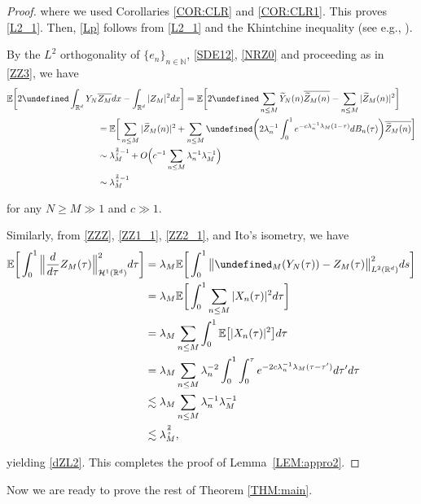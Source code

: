 \documentclass[%
11pt,  reqno]{amsart}
\theoremstyle{remarkstyle}
\newcommand{\1}{\hspace{0.2mm}\text{I}\hspace{0.2mm}}
\newcommand{\noi}{\noindent}
\newcommand{\R}{\mathbb{R}}
\let\Re=\undefined\DeclareMathOperator*{\Re}{Re}
\let\P= \undefined
\newcommand{\P}{\mathbf{P}}
\newcommand{\E}{\mathbb{E}}
\newcommand{\ld}{\lambda}
\newcommand{\wt}{\widetilde}
\newcommand{\cj}{\overline}
\newcommand{\les}{\lesssim}
\newcommand{\N}{\mathbb{N}}
\renewcommand{\H}{\mathcal{H}}
\numberwithin{equation}{section}
\numberwithin{theorem}{section}
\begin{document}
\begin{proof}
		\noi 
		where we used Corollaries \ref{COR:CLR} and \ref{COR:CLR1}. This proves \eqref{L2_1}.
		Then, \eqref{Lp} follows from \eqref{L2_1} and the Khintchine inequality (see e.g., \cite[Lemma 4.2]{BT08a}).
		
		By the $L^2$ orthogonality of $\{e_n\}_{n\in\N}$,  \eqref{SDE12}, \eqref{NRZ0} and  
		proceeding as in \eqref{ZZ3}, we have
		\begin{align*}
			\E\bigg[  2 \Re \int_{{\R^d}} Y_N & \cj{Z_M} dx - \int_{{\R^d}} |Z_M|^2 dx   \bigg]
			=\E \bigg[ 2 \Re \sum_{n \le M }\wt Y_N(n)  \cj{ \wt Z_M(n)} -\sum_{n \le M }|  \wt Z_M(n) |^2    \bigg]\\
			&=\E \bigg[ \sum_{n \le M } | \wt Z_M(n)  |^2+ \sum_{n \le M } \Re \bigg( 2 \ld_n^{-1}  \int_0^1 e^{- c \ld_n^{-1} \ld_M    (1-\tau) }dB_n(\tau) \bigg)  \cj{\wt Z_M(n)}   \bigg]\\
			&\sim \ld_M^{\frac2s-1} +O\Big( c^{-1} \sum_{n \le M } \ld_n^{-1} \ld_M^{-1}  \Big)\\
			&\sim \ld_M^{\frac2s-1} 
		\end{align*} 
		
		\noi 
		for any $N\ge M\gg 1$ and $c \gg 1$.
		
		Similarly, from \eqref{ZZZ}, \eqref{ZZ1_1}, \eqref{ZZ2_1}, and Ito's isometry, we have 
		\begin{align*}
			\E\bigg[\int_0^1 \Big\| \frac d {d\tau} Z_M(\tau) \Big\|^2_{\H^1(\R^d)}d\tau\bigg] &= \ld_M \E\bigg[\int_0^1 \big\| \P_{ M}(Y_N(\tau)) - Z_M(\tau) \big\|^2_{L^2(\R^d)}ds\bigg] \\
			&=  \ld_M \E\bigg[ \int_0^1  \sum_{n \le M} |X_n(\tau)|^2   d\tau\bigg]\\
			&=  \ld_M \sum_{n \le M} \int_0^1\E\big[|X_n(\tau)|^2\big] d\tau \\
			&= \ld_M \sum_{n \le M} \ld_n^{-2} \int_0^1 \int_0^\tau e^{-2 c \ld_n^{-1} \ld_M  (\tau-\tau')} d \tau' d\tau \\
			& \les \ld_M \sum_{n \le M } \ld_n^{-1} \ld_M^{-1} \\
			&\les  \ld_M^{\frac{2}s }, 
		\end{align*}
		
		\noi
		yielding  \eqref{dZL2}.
		This completes the proof of Lemma~\ref{LEM:appro2}.
	\end{proof}
	
	
	\medskip
	
	Now we are ready to prove the rest of Theorem \ref{THM:main}.
	
\end{document}
